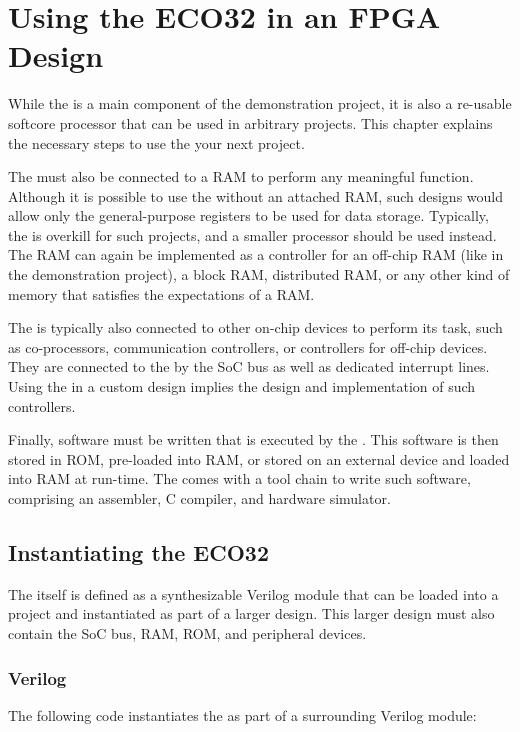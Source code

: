 \chapter{Using the ECO32 in an FPGA Design}

While the \eco is a main component of the demonstration project, it is also a re-usable softcore processor that can be used in arbitrary projects. This chapter explains the necessary steps to use the \eco your next project.



The \eco must also be connected to a RAM to perform any meaningful function. Although it is possible to use the \eco without an attached RAM, such designs would allow only the general-purpose registers to be used for data storage. Typically, the \eco is overkill for such projects, and a smaller processor should be used instead. The RAM can again be implemented as a controller for an off-chip RAM (like in the demonstration project), a block RAM, distributed RAM, or any other kind of memory that satisfies the expectations of a RAM.

The \eco is typically also connected to other on-chip devices to perform its task, such as co-processors, communication controllers, or controllers for off-chip devices. They are connected to the \eco by the SoC bus as well as dedicated interrupt lines. Using the \eco in a custom design implies the design and implementation of such controllers.

Finally, software must be written that is executed by the \ecox. This software is then stored in ROM, pre-loaded into RAM, or stored on an external device and loaded into RAM at run-time. The \eco comes with a tool chain to write such software, comprising an assembler, C compiler, and hardware simulator.

\section{Instantiating the ECO32}

The \eco itself is defined as a synthesizable Verilog module that can be loaded into a project and instantiated as part of a larger design. This larger design must also contain the SoC bus, RAM, ROM, and peripheral devices.

\subsection{Verilog}

The following code instantiates the \eco as part of a surrounding Verilog module:

